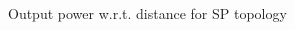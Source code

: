 
\begin{figure}[h]
\centering
\begin{subfigmatrix}{2} 
\end{subfigmatrix}
\end{figure}
\begin{figure}[H]
\centering
\begin{subfigmatrix}{1} 
\end{subfigmatrix}
\caption{Output power w.r.t. distance for SP topology}
\end{figure}


